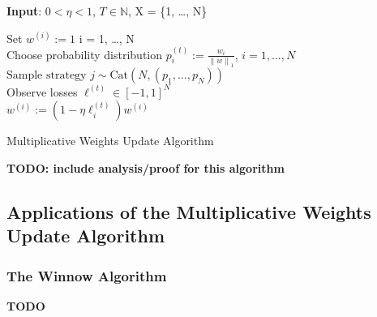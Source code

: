 \documentclass[12pt]{article}
\newcommand*{\norm}[1]{\left\lVert#1\right\rVert}
\begin{document}
 \begin{algorithm}[H]
	\SetAlgoLined
	
	\textbf{Input}: $0 < \eta < 1$, $T \in \mathbb{N}$,  X = \{1, \dots, N\} \\
	
	\bigskip
	
	Set $w^{(i)} := 1$  i = 1, \dots, N \\
	
	 {
		Choose probability distribution $p^{(t)}_i := \frac{w_i}{\norm{w}_1}$, $i = 1, \dots, N$ \\
		$\text{Sample strategy } j \sim \text{Cat}(N, (p_1, \dots, p_N))$ \\
		Observe losses $\ell^{(t)} \in [-1, 1]^N$ \\
		
		 {
			$w^{(i)} := (1 - \eta \ell_i^{(t)})w^{(i)}$ \\
		}
	}			
\caption{Multiplicative Weights Update Algorithm}
\end{algorithm}

\bigskip

\textbf{TODO: include analysis/proof for this algorithm}

\subsection{Applications of the Multiplicative Weights Update Algorithm}
\subsubsection{The Winnow Algorithm}
\textbf{TODO}



\end{document}
